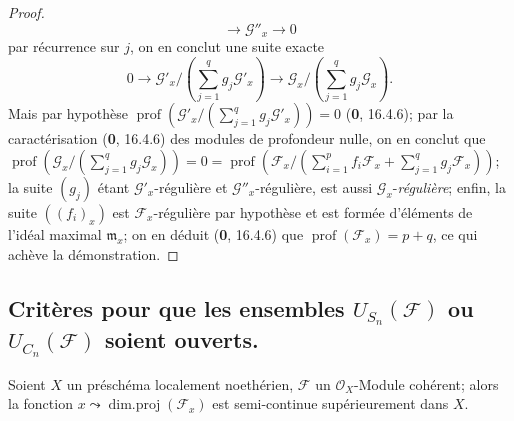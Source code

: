 \begin{proof}
\[\longrightarrow\mathcal G''_x\longrightarrow0
\]
par récurrence sur $j$, on en conclut une suite exacte
\[
0\longrightarrow\mathcal G'_x/
\left(\sum_{j=1}^{q}g_j\mathcal G'_x\right)
\longrightarrow\mathcal G_x/
\left(\sum_{j=1}^{q}g_j\mathcal G_x\right).
\]
Mais par hypothèse
$\operatorname{prof}(\mathcal G'_x/(\sum_{j=1}^{q}g_j\mathcal G'_x))=0$
(\textbf{0}, 16.4.6); par la caractérisation (\textbf{0}, 16.4.6) des modules de profondeur
nulle, on en conclut que
$\operatorname{prof}(\mathcal G_x/(\sum_{j=1}^{q}g_j\mathcal G_x))=0=\operatorname{prof}(\mathcal F_x/(\sum_{i=1}^{p}f_i\mathcal F_x+\sum_{j=1}^{q}g_j\mathcal F_x))$;
la suite $(g_j)$ étant $\mathcal G'_x$-régulière et
$\mathcal G''_x$-régulière, est aussi $\mathcal G_x$-\emph{régulière}; enfin, la
suite $((f_i)_x)$ est $\mathcal F_x$-régulière par hypothèse et est formée
d'éléments de l'idéal maximal $\mathfrak m_x$; on en déduit (\textbf{0}, 16.4.6)
que $\operatorname{prof}(\mathcal F_x)=p+q$, ce qui achève la
démonstration.
\end{proof}

\subsection{\texorpdfstring{Critères pour que les ensembles
$U_{S_n}(\mathcal F)$ ou $U_{C_n}(\mathcal F)$ soient ouverts.}{Critères pour que les ensembles U\string_(F) ou U\string_(F) soient ouverts}}
\label{IV.2.s6.11-fr}

\begin{lemma}[6.11.1]
\label{IV.2.s6.11.1-fr}
Soient $X$ un préschéma localement noethérien, $\mathcal F$ un
$\mathcal O_X$-Module cohérent; alors la fonction
$x\leadsto\operatorname{dim.proj}(\mathcal F_x)$ est semi-continue
supérieurement dans $X$.
\end{lemma}


